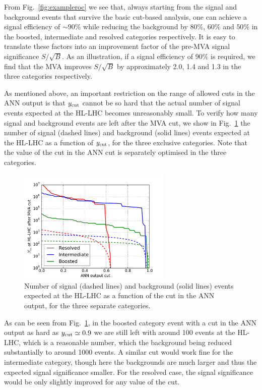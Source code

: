 From Fig.~\ref{fig:exampleroc} we see that, always starting from the signal
and background events that survive the basic cut-based analysis,
one can achieve a  signal
efficiency of $\sim 90\%$ while reducing the background by
$80\%$, $60\%$ and $50\%$ in the boosted, intermediate and resolved
categories respectively.
%
It is easy to translate these factors into an  improvement factor of the pre-MVA
signal significance $S/\sqrt{B}$.
%
As an illustration, if a signal efficiency of 90\%
is required, we find that the MVA improves $S/\sqrt{B}$
by  approximately 2.0, 1.4 and 1.3  in the three categories respectively.

As mentioned above, an
 important restriction on the range of allowed cuts in the ANN output
 is that $y_{\rm cut}$
 cannot be so hard that the actual number of signal events expected
at the HL-LHC becomes unreasonably small.
%
To verify how many signal and background events are left after the MVA cut,
we show in Fig.~\ref{fig:nev2} the number of signal (dashed lines) and background (solid lines)
  events expected at the HL-LHC as a function of $y_{\rm cut}$,
  for the three exclusive categories.
  Note that the value of the cut in the ANN cut is separately optimised in the three
  categories.

\begin{figure}[t]
\begin{center}
\includegraphics[width=0.65\textwidth]{plots/nev2.pdf}
\caption{\small Number of signal (dashed lines) and background (solid lines)
  events expected at the HL-LHC as a function of the cut in the ANN output,
  for the three separate categories.
}
\label{fig:nev2}
\end{center}
\end{figure}

As can be seen from Fig.~\ref{fig:nev2}, in the boosted category
event with a cut in the ANN output as hard as $y_{\rm cut}\simeq 0.9$
we are still left
with around 100 events at the HL-LHC, which is a reasonable number,
which the background being reduced substantially to around
1000 events.
%
A similar cut would work fine for the intermediate category, though here
the backgrounds are much larger and thus the expected signal significance smaller.
%
For the resolved case, the signal significance would be only slightly
improved for any value of the cut.

